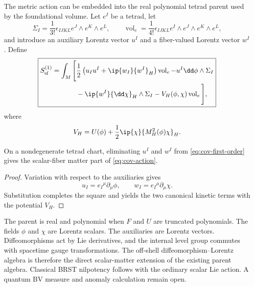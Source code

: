 The metric action can be embedded into the real polynomial tetrad parent used by the foundational volume.  Let $e^I$ be a tetrad, let
\begin{equation}
\Sigma_I=\frac1{3!}\epsilon_{IJKL}e^J\wedge e^K\wedge e^L,
\qquad
\operatorname{vol}_e=\frac1{4!}\epsilon_{IJKL}e^I\wedge e^J\wedge e^K\wedge e^L,
\end{equation}
and introduce an auxiliary Lorentz vector $u^I$ and a fiber-valued Lorentz vector $w^I$.  Define
\begin{equation}
\boxed{
\begin{aligned}
S_{\mathrm{sf}}^{(1)}=\int_M\Bigg[
&\frac12\left(u_Iu^I+\ip{w_I}{w^I}_H\right)\operatorname{vol}_e
-u^I\dd\phi\wedge\Sigma_I\\
&-\ip{w^I}{\dd\chi}_H\wedge\Sigma_I
-V_H(\phi,\chi)\operatorname{vol}_e
\Bigg],
\end{aligned}}
\label{eq:cov-first-order}
\end{equation}
where
\begin{equation}
V_H=U(\phi)+\frac12\ip{\chi}{M_H^2(\phi)\chi}_H.
\end{equation}

\begin{theorem}
On a nondegenerate tetrad chart, eliminating $u^I$ and $w^I$ from \eqref{eq:cov-first-order} gives the scalar-fiber matter part of \eqref{eq:cov-action}.
\end{theorem}

\begin{proof}
Variation with respect to the auxiliaries gives
\begin{equation}
u_I=e_I{}^\mu\partial_\mu\phi,
\qquad
w_I=e_I{}^\mu\partial_\mu\chi.
\end{equation}
Substitution completes the square and yields the two canonical kinetic terms with the potential $V_H$.
\end{proof}

The parent is real and polynomial when $F$ and $U$ are truncated polynomials.  The fields $\phi$ and $\chi$ are Lorentz scalars.  The auxiliaries are Lorentz vectors.  Diffeomorphisms act by Lie derivatives, and the internal level group commutes with spacetime gauge transformations.  The off-shell diffeomorphism--Lorentz algebra is therefore the direct scalar-matter extension of the existing parent algebra.  Classical BRST nilpotency follows with the ordinary scalar Lie action.  A quantum BV measure and anomaly calculation remain open.
